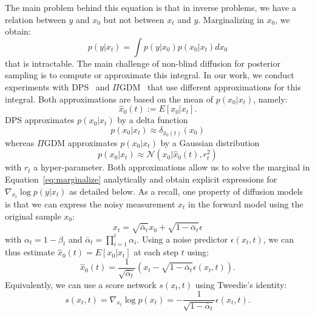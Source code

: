 \documentclass[10pt,twocolumn,letterpaper]{article}
\newcommand{\xZeroHat}{\ensuremath{\widehat{x}_0(t)}}
\begin{document}
%
The main problem behind this equation is that in inverse problems, we have a relation between $y$ and $x_0$ but not between $x_t$ and $y$. Marginalizing in $x_0$, we obtain:
%
\begin{equation}\label{eq:marginalize}
    p(y|x_t) = \int p(y|x_0)p(x_0|x_t)dx_0
\end{equation}
%
that is intractable. 
%
The main challenge of non-blind diffusion for posterior sampling is to compute or approximate this integral. In our work, we conduct experiments with DPS~\cite{chung_diffusion_2023} and $\Pi$GDM~\cite{song_pseudoinverse-guided_2023} that use different approximations for this integral. Both approximations are based on the mean of $p(x_0|x_t)$, namely:
\[\label{eq:x0hat}
\xZeroHat := E[x_0|x_t].\]
DPS approximates $p(x_0|x_t)$ by a delta function
\begin{equation}\label{eq:dps-approx}
    p(x_0|x_t) \approx \delta_{\xZeroHat}(x_0)
\end{equation}
whereas $\Pi$GDM approximates $p(x_0|x_t)$ by a Gaussian distribution
\begin{equation}\label{eq:pigdm-approx}
    p(x_0|x_t)\approx \mathcal{N}(x_0 | \xZeroHat, r_t^2)
\end{equation}
with $r_t$ a hyper-parameter.
Both approximations allow us to solve the marginal in Equation~\eqref{eq:marginalize} analytically and obtain explicit expressions for $\nabla_{{x_t}} \log p(y|{x_t})$ as detailed below.
\newline
\newline
As a recall, one property of diffusion models is that we can express the noisy measurement $x_t$ in the forward model using the original sample $x_0$:
%
\begin{equation}
    x_t = \sqrt{\bar{\alpha}_t} x_0 + \sqrt{1-\bar{\alpha}_t}\epsilon
\end{equation}
with $\alpha_t = 1 - \beta_t$ and $\bar{\alpha}_t = \prod\limits_{i=1}^t{\alpha_i}$.
%
\newline
%
Using a noise predictor $\epsilon(x_t, t)$, we can thus estimate $\xZeroHat = E[x_0|x_t]$ at each step $t$ using:
%
\begin{equation}
    \label{equ:x_0_hat}
    \xZeroHat = \frac{1}{\sqrt{\bar{\alpha}_t}}(x_t - \sqrt{1-\bar{\alpha}_t}\epsilon(x_t, t)).
\end{equation}
Equivalently, we can use a score network $s(x_t, t)$ using Tweedie's identity:
\begin{equation}\label{eq:Tweedie}
    s(x_t, t) = \nabla_{x_t} \log p(x_t)= -\frac{1}{\sqrt{1-\bar{\alpha}_t}}\epsilon(x_t, t).
\end{equation}
\end{document}
